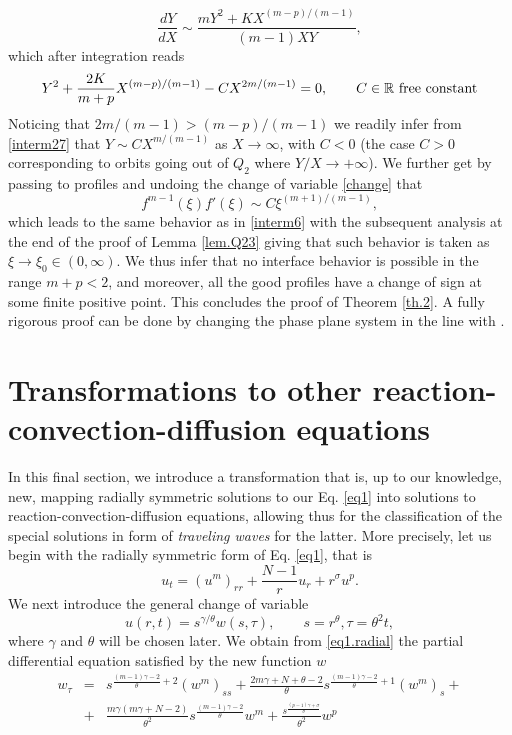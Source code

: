 \documentclass[a4paper,11pt]{article}
\numberwithin{equation}{section}
\newcommand{\real}{\mathbb{R}}
\begin{document}
$$
\frac{dY}{dX}\sim\frac{mY^2+KX^{(m-p)/(m-1)}}{(m-1)XY},
$$
which after integration reads
\begin{equation}\label{interm27}
Y^2+\frac{2K}{m+p}X^{(m-p)/(m-1)}-CX^{2m/(m-1)}=0, \qquad C\in\real \ {\rm free \ constant}
\end{equation}
Noticing that $2m/(m-1)>(m-p)/(m-1)$ we readily infer from \eqref{interm27} that $Y\sim CX^{m/(m-1)}$ as $X\to\infty$, with $C<0$ (the case $C>0$ corresponding to orbits going out of $Q_2$ where $Y/X\to+\infty$). We further get by passing to profiles and undoing the change of variable \eqref{change} that
$$
f^{m-1}(\xi)f'(\xi)\sim C\xi^{(m+1)/(m-1)},
$$
which leads to the same behavior as in \eqref{interm6} with the subsequent analysis at the end of the proof of Lemma \ref{lem.Q23} giving that such behavior is taken as $\xi\to\xi_0\in(0,\infty)$. We thus infer that no interface behavior is possible in the range $m+p<2$, and moreover, all the good profiles have a change of sign at some finite positive point. This concludes the proof of Theorem \ref{th.2}. A fully rigorous proof can be done by changing the phase plane system in the line with \cite[Section 7]{IS20b}.

\section{Transformations to other reaction-convection-diffusion equations}\label{sec.transf}

In this final section, we introduce a transformation that is, up to our knowledge, new, mapping radially symmetric solutions to our Eq. \eqref{eq1} into solutions to reaction-convection-diffusion equations, allowing thus for the classification of the special solutions in form of \emph{traveling waves} for the latter. More precisely, let us begin with the radially symmetric form of Eq. \eqref{eq1}, that is
\begin{equation}\label{eq1.radial}
u_t=(u^m)_{rr}+\frac{N-1}{r}u_r+r^\sigma u^p.
\end{equation}
We next introduce the general change of variable
\begin{equation}\label{interm26}
u(r,t)=s^{\gamma/\theta}w(s,\tau), \qquad s=r^\theta, \tau =\theta^2 t,
\end{equation}
where $\gamma$ and $\theta$ will be chosen later. We obtain from \eqref{eq1.radial} the partial differential equation satisfied by the new function $w$
\begin{eqnarray}\label{eq2}
w_\tau&=&s^{\frac{(m-1)\gamma-2}{\theta}+2}(w^m)_{ss}+\frac{2m\gamma+N+\theta-2}\theta s^{\frac{(m-1)\gamma-2}{\theta}+1}(w^m)_s+\nonumber\\
&+&\frac{m\gamma(m\gamma+N-2)}{\theta^2}s^{\frac{(m-1)\gamma-2}{\theta}}w^m+\frac{s^{\frac{(p-1)\gamma+\sigma}{\theta}}}{\theta^2}w^p
\end{eqnarray}
\end{document}
